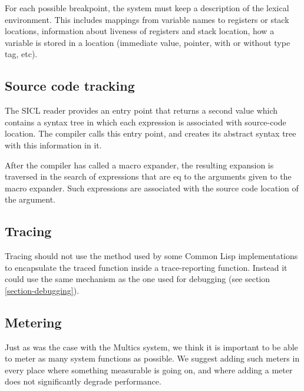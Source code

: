 \documentclass{article}
\begin{document}
For each possible breakpoint, the system must keep a description of
the lexical environment.  This includes mappings from variable names
to registers or stack locations, information about liveness of
registers and stack location, how a variable is stored in a location
(immediate value, pointer, with or without type tag, etc). 

\subsection{Source code tracking}

The SICL reader provides an entry point that returns a second value
which contains a syntax tree in which each expression is associated
with source-code location.  The compiler calls this entry point, and
creates its abstract syntax tree with this information in it.  

After the compiler has called a macro expander, the resulting
expansion is traversed in the search of expressions that are eq to the
arguments given to the macro expander.  Such expressions are
associated with the source code location of the argument. 

\subsection{Tracing}

Tracing should not use the method used by some Common Lisp
implementations to encapsulate the traced function inside a
trace-reporting function.  Instead it could use the same mechanism as
the one used for debugging (see section \ref{section-debugging}). 

\subsection{Metering}

Just as was the case with the Multics system, we think it is important
to be able to meter as many system functions as possible.  We suggest
adding such meters in every place where something measurable is going
on, and where adding a meter does not significantly degrade
performance.  
\end{document}
